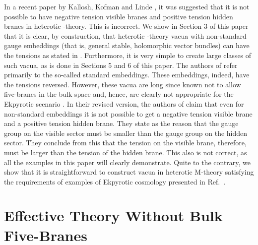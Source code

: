 \documentclass[a4paper,12pt]{article}
\numberwithin{equation}{section}
\theoremstyle{plain}
\begin{document}
In a recent paper by Kallosh, Kofman and Linde \cite{KKL}, it was suggested that 
it is not possible to have negative
tension visible branes and positive tension hidden branes in heterotic
\coordHE{}-theory. This is incorrect. We show in Section 3 of this paper that it is
clear,
by construction, that heterotic \coordHE{}-theory vacua with non-standard gauge embeddings
(that is, general stable, holomorphic vector bundles) can have the
tensions as stated in \cite{EU}. Furthermore, it is very simple
to create large classes of such vacua, as is done in Sections 5 and 6 of
this paper. The authors
of \cite{KKL} refer primarily to the so-called standard embeddings. 
These embeddings, indeed, have
the tensions reversed. However, these vacua are long since known not to allow
five-branes in the bulk space and, hence, are clearly not appropriate for the 
Ekpyrotic scenario \cite{EU}. In their revised version, the authors of
\cite{KKL} claim that even for non-standard embeddings it is not
possible to get a negative tension visible brane and a positive tension hidden
brane. They state as the reason that the gauge group on the visible sector
must be smaller than the gauge group on the hidden sector. They conclude from
this that the tension on the visible brane, therefore, must be larger than the
tension of the hidden brane. This also is not correct, as all the examples in
this paper will clearly demonstrate. Quite to the contrary, 
we show that it is straightforward 
to construct vacua in heterotic M-theory satisfying the requirements of 
examples of Ekpyrotic cosmology presented in Ref.~\cite{EU}. 

\section{Effective Theory Without Bulk Five-Branes}
\end{document}
